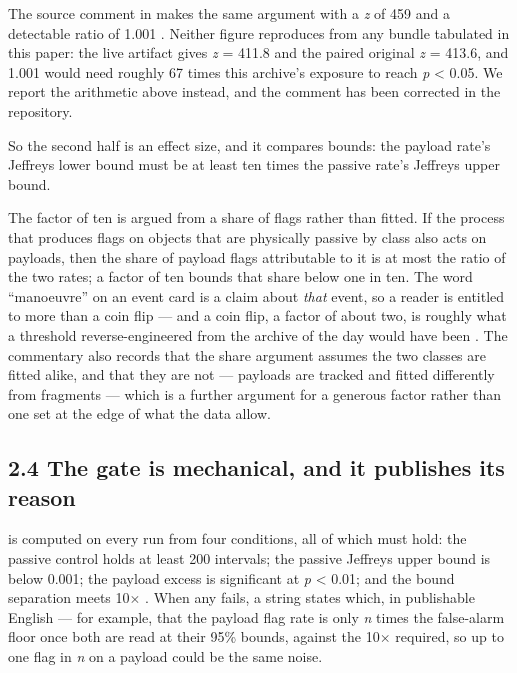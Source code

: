 \documentclass[11pt]{article}
\begin{document}
The source comment in  makes the same argument with a \emph{z} of 459 and a detectable ratio of 1.001%
. Neither figure reproduces from any bundle tabulated in this paper: the live artifact gives \emph{z} = 411.8 and the paired original \emph{z} = 413.6, and 1.001 would need roughly 67 times this archive's exposure to reach \emph{p} < 0.05. We report the arithmetic above instead, and the comment has been corrected in the repository.

So the second half is an effect size, and it compares bounds: the payload rate's Jeffreys lower bound must be at least ten times the passive rate's Jeffreys upper bound.

The factor of ten is argued from a share of flags rather than fitted. If the process that produces flags on objects that are physically passive by class also acts on payloads, then the share of payload flags attributable to it is at most the ratio of the two rates; a factor of ten bounds that share below one in ten. The word ``manoeuvre'' on an event card is a claim about \emph{that} event, so a reader is entitled to more than a coin flip --- and a coin flip, a factor of about two, is roughly what a threshold reverse-engineered from the archive of the day would have been%
. The commentary also records that the share argument assumes the two classes are fitted alike, and that they are not --- payloads are tracked and fitted differently from fragments --- which is a further argument for a generous factor rather than one set at the edge of what the data allow.

\subsection*{2.4 The gate is mechanical, and it publishes its reason}

 is computed on every run from four conditions, all of which must hold: the passive control holds at least 200 intervals; the passive Jeffreys upper bound is below 0.001; the payload excess is significant at \emph{p} < 0.01; and the bound separation meets 10$\times$%
. When any fails, a  string states which, in publishable English --- for example, that the payload flag rate is only \emph{n} times the false-alarm floor once both are read at their 95\% bounds, against the 10$\times$ required, so up to one flag in \emph{n} on a payload could be the same noise.
\end{document}
